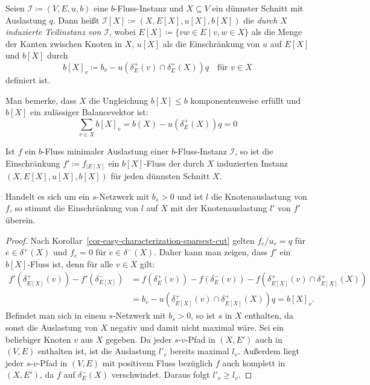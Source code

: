 \begin{definition}
	Seien $\mathcal{I}\coloneq (V, E, u, b)$ eine $b$-Fluss-Instanz und $X\subseteq V$ ein dünnster Schnitt mit Auslastung $q$.
	Dann heißt $\mathcal{I}[X] \coloneq (X, E[X], u[X], b[X])$ die \emph{durch $X$ induzierte Teilinstanz von $\mathcal{I}$},
	wobei $E[X] \coloneq \{ vw \in E \mid v, w \in X \}$ als die Menge der Kanten zwischen Knoten in $X$, $u[X]$ als die Einschränkung von $u$ auf $E[X]$ und $b[X]$ durch \[
	b[X]_v \coloneq b_v - u(\delta^+_E(v)\cap\delta^+_E(X)) q \quad \text{für $v\in X$}
\] definiert ist.
\end{definition}

Man bemerke, dass $X$ die Ungleichung $b[X] \leq b$ komponentenweise erfüllt und $b[X]$ ein zulässiger Balancevektor ist: \[
	\sum_{v\in X} b[X]_v = b(X) - u(\delta^+_E(X)) q = 0
\]

\begin{proposition}\label{prop-restricted-minimal-flow-is-b-flow-on-induced-instance}
	Ist $f$ ein $b$-Fluss minimaler Auslastung einer $b$-Fluss-Instanz $\mathcal{I}$, so ist die Einschränkung $f'\coloneq f_{\mid E[X]}$ ein $b[X]$-Fluss der durch $X$ induzierten Instanz $(X, E[X], u[X], b[X])$ für jeden dünnsten Schnitt $X$.
	
	Handelt es sich um ein $s$-Netzwerk mit $b_s > 0$ und ist $l$ die Knotenauslastung von $f$, so stimmt die Einschränkung von $l$ auf $X$ mit der Knotenauslastung $l'$ von $f'$ überein.
\end{proposition}
\begin{proof}
	Nach Korollar~\ref{cor-easy-characterization-sparsest-cut} gelten $f_{e}/u_{e}=q$ für $e\in\delta^+(X)$ und $f_{e} = 0$ für $e\in\delta^-(X)$.
	Daher kann man zeigen, dass $f'$ ein $b[X]$-Fluss ist, denn für alle $v\in X$ gilt:
	\begin{align*}
	f'(\delta^+_{E[X]}(v)) - f'(\delta^-_{E[X]}) &= f(\delta^+_E(v)) - f(\delta^-_E(v)) - f(\delta^+_{E[X]}(v)\cap\delta^+_{E[X]}(X)) \\
	&= b_v - u(\delta^+_{E[X]}(v)\cap\delta^+_{E[X]}(X))q = b[X]_v.
	\end{align*}
	Befindet man sich in einem $s$-Netzwerk mit $b_s > 0$, so ist $s$ in $X$ enthalten, da sonst die Auslastung von $X$ negativ und damit nicht maximal wäre.
	Sei ein beliebiger Knoten $v$ aus $X$ gegeben.
	Da jeder $s$-$v$-Pfad in $(X, E')$ auch in $(V, E)$ enthalten ist, ist die Auslastung $l'_v$ bereits maximal $l_v$.
	Außerdem liegt jeder $s$-$v$-Pfad in $(V, E)$ mit positivem Fluss bezüglich $f$ auch komplett in $(X, E')$, da $f$ auf $\delta^-_E(X)$ verschwindet.
	Daraus folgt $l'_v \geq l_v$.
\end{proof}

